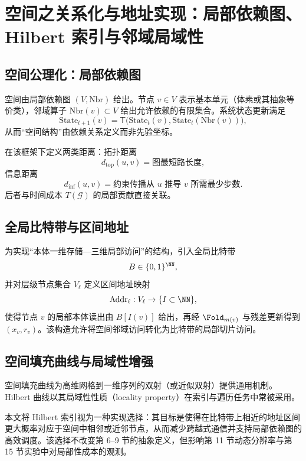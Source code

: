 \section{空间之关系化与地址实现：局部依赖图、Hilbert 索引与邻域局域性}

\subsection{空间公理化：局部依赖图}

\begin{definition}[局部依赖图]
空间由局部依赖图 $(V,\mathrm{Nbr})$ 给出。节点 $v\in V$ 表示基本单元（体素或其抽象等价类），邻域算子 $\mathrm{Nbr}(v)\subset V$ 给出允许依赖的有限集合。系统状态更新满足
$$
\mathrm{State}_{t+1}(v)=\mathsf T\bigl(\mathrm{State}_t(v),\mathrm{State}_t(\mathrm{Nbr}(v))\bigr),
$$
从而“空间结构”由依赖关系定义而非先验坐标。
\end{definition}

在该框架下定义两类距离：拓扑距离
$$
d_{\mathrm{top}}(u,v)=\text{图最短路长度},
$$
信息距离
$$
d_{\mathrm{inf}}(u,v)=\text{约束传播从 }u\text{ 推导 }v\text{ 所需最少步数}.
$$
后者与时间成本 $T(\mathcal G)$ 的局部贡献直接关联。

\subsection{全局比特带与区间地址}

为实现“本体一维存储—三维局部访问”的结构，引入全局比特带
$$
B\in\{0,1\}^{\NN},
$$
并对层级节点集合 $V_\ell$ 定义区间地址映射
$$
\mathrm{Addr}_\ell:V_\ell\to\{I\subset\NN\},
$$
使得节点 $v$ 的局部本体读出由 $B[I(v)]$ 给出，再经 $\Fold_{m(v)}$ 与残差更新得到 $(x_v,r_v)$。该构造允许将空间邻域访问转化为比特带的局部切片访问。

\subsection{空间填充曲线与局域性增强}

空间填充曲线为高维网格到一维序列的双射（或近似双射）提供通用机制。Hilbert 曲线以其局域性性质（locality property）在索引与遍历任务中常被采用。\cite{wikipedia_hilbert_curve}

本文将 Hilbert 索引视为一种实现选择：其目标是使得在比特带上相近的地址区间更大概率对应于空间中相邻或近邻节点，从而减少跨越式通信并支持局部依赖图的高效调度。该选择不改变第 6--9 节的抽象定义，但影响第 11 节动态分辨率与第 15 节实验中对局部性成本的观测。
